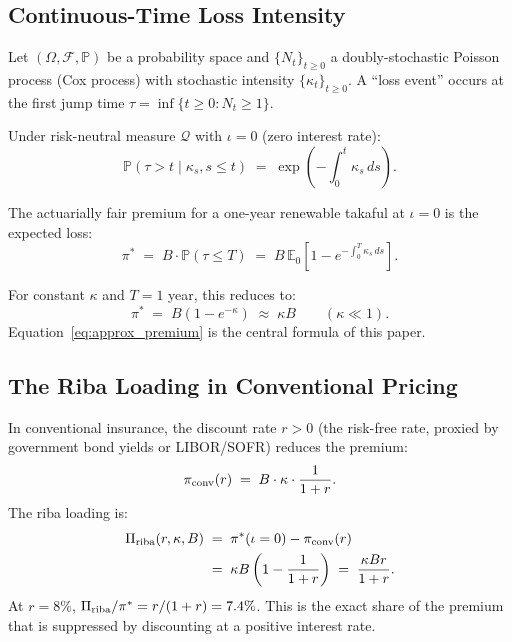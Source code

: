 \documentclass[12pt,a4paper]{article}
\newcommand{\E}{\mathbb{E}}
\newcommand{\Prob}{\mathbb{P}}
\newcommand{\cF}{\mathcal{F}}
\newcommand{\cQ}{\mathcal{Q}}
\begin{document}
\subsection{Continuous-Time Loss Intensity}

Let $(\Omega,\cF,\Prob)$ be a probability space and $\{N_t\}_{t\geq 0}$ a
doubly-stochastic Poisson process (Cox process) with stochastic intensity
$\{\kappa_t\}_{t\geq 0}$.
A ``loss event'' occurs at the first jump time
$\tau = \inf\{t\geq 0: N_t \geq 1\}$.

Under risk-neutral measure $\cQ$ with $\iota=0$ (zero interest rate):
\begin{equation}
  \Prob(\tau > t \mid \kappa_s, s\leq t) \;=\; \exp\!\left(-\int_0^t \kappa_s\,ds\right).
  \label{eq:survival}
\end{equation}

The actuarially fair premium for a one-year renewable takaful at $\iota=0$ is the
expected loss:
\begin{equation}
  \pi^* \;=\; B \cdot \Prob(\tau \leq T) \;=\;
  B\,\E_0\!\left[1 - e^{-\int_0^T \kappa_s\,ds}\right].
  \label{eq:fair_premium}
\end{equation}

For constant $\kappa$ and $T=1$ year, this reduces to:
\begin{equation}
  \pi^* \;=\; B(1 - e^{-\kappa}) \;\approx\; \kappa B \qquad (\kappa \ll 1).
  \label{eq:approx_premium}
\end{equation}
Equation~\eqref{eq:approx_premium} is the central formula of this paper.

\subsection{The Riba Loading in Conventional Pricing}

In conventional insurance, the discount rate $r>0$ (the risk-free rate, proxied by
government bond yields or LIBOR/SOFR) reduces the premium:
\begin{equation}
  \pi_{\rm conv}(r) \;=\; B \cdot \kappa \cdot \frac{1}{1+r}.
  \label{eq:conv_disc}
\end{equation}
The riba loading is:
\begin{align}
  \Pi_{\rm riba}(r,\kappa,B) &\;=\; \pi^*(\iota=0) - \pi_{\rm conv}(r) \notag\\
    &\;=\; \kappa B \left(1 - \frac{1}{1+r}\right) \;=\; \frac{\kappa B r}{1+r}.
  \label{eq:riba_formula}
\end{align}
At $r=8\%$, $\Pi_{\rm riba}/\pi^* = r/(1+r) = 7.4\%$.
This is the exact share of the premium that is suppressed by discounting at a
positive interest rate.
\end{document}
